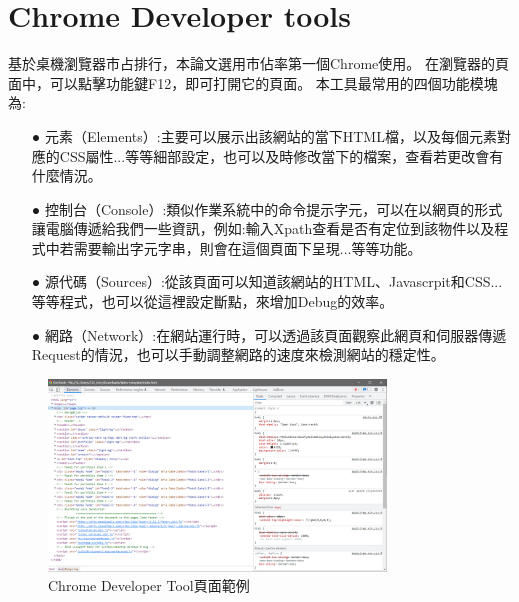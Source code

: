 

\section{Chrome Developer tools}\label{s2.5}
基於桌機瀏覽器市占排行，本論文選用市佔率第一個Chrome使用。
在瀏覽器的頁面中，可以點擊功能鍵F12，即可打開它的頁面。
本工具最常用的四個功能模塊為:
\begin{itemize}
    \item[●] 元素（Elements）:主要可以展示出該網站的當下HTML檔，以及每個元素對應的CSS屬性...等等細部設定，也可以及時修改當下的檔案，查看若更改會有什麼情況。
    \item[●] 控制台（Console）:類似作業系統中的命令提示字元，可以在以網頁的形式讓電腦傳遞給我們一些資訊，例如:輸入Xpath查看是否有定位到該物件以及程式中若需要輸出字元字串，則會在這個頁面下呈現...等等功能。
    \item[●] 源代碼（Sources）:從該頁面可以知道該網站的HTML、Javascrpit和CSS...等等程式，也可以從這裡設定斷點，來增加Debug的效率。
    \item[●] 網路（Network）:在網站運行時，可以透過該頁面觀察此網頁和伺服器傳遞Request的情況，也可以手動調整網路的速度來檢測網站的穩定性。
\end{itemize}

\begin{figure}[H]
    \centering
    \includegraphics[width=0.8\textwidth]{picture/ch2-chromeDeveloperTool.png}
    \caption{Chrome Developer Tool頁面範例}
    \label{f2.3}
\end{figure}

